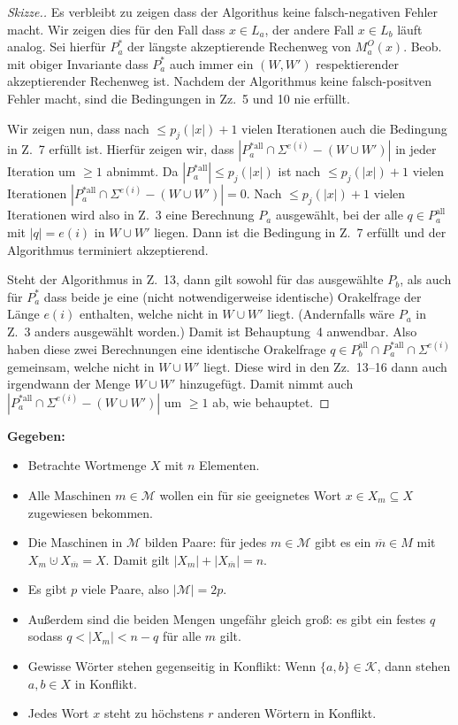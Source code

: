 \documentclass[nofonts]{uebung}
\begin{document}
\begin{proof}[Skizze.]
Es verbleibt zu zeigen dass der Algorithus keine falsch-negativen Fehler macht.
Wir zeigen dies für den Fall dass $x\in L_a$, der andere Fall $x\in L_b$ läuft analog.
Sei hierfür $P_a^*$ der längste akzeptierende Rechenweg von $M_a^O(x)$.
Beob. mit obiger Invariante dass $P_a^*$ auch immer ein $(W,W')$ respektierender akzeptierender Rechenweg ist.
Nachdem der Algorithmus keine falsch-positven Fehler macht, sind die Bedingungen in Zz.~5 und 10 nie erfüllt.

Wir zeigen nun, dass nach $\leq p_j(|x|)+1$ vielen Iterationen auch die Bedingung in Z.~7 erfüllt ist.
Hierfür zeigen wir, dass $|P_a^{*\mathrm{all}}\cap \Sigma^{e(i)}-(W\cup W')|$ in jeder Iteration um $\geq 1$ abnimmt. Da $|P_a^{*\mathrm{all}}|\leq p_j(|x|)$ ist nach $\leq p_j(|x|)+1$ vielen Iterationen $|P_a^{*\mathrm{all}}\cap \Sigma^{e(i)}-(W\cup W')|=0$.
Nach $\leq p_j(|x|)+1$ vielen Iterationen wird also in Z.~3 eine Berechnung $P_a$ ausgewählt, bei der alle $q\in P_a^{\mathrm{all}}$ mit $|q|=e(i)$ in $W\cup W'$ liegen. Dann ist die Bedingung in Z.~7 erfüllt und der Algorithmus terminiert akzeptierend.

Steht der Algorithmus in Z.~13, dann gilt sowohl für das ausgewählte $P_b$, als auch für $P_a^*$ dass beide je eine (nicht notwendigerweise identische) Orakelfrage der Länge $e(i)$ enthalten, welche nicht in $W\cup W'$ liegt. (Andernfalls  wäre $P_a$ in Z.~3 anders ausgewählt worden.)
Damit ist Behauptung~4 anwendbar. Also haben diese zwei Berechnungen eine identische Orakelfrage $q\in P_b^\mathrm{all}\cap P_a^{*\mathrm{all}}\cap \Sigma^{e(i)}$ gemeinsam, welche nicht in $W\cup W'$ liegt.
Diese wird in den Zz.~13--16 dann auch irgendwann der Menge $W\cup W'$ hinzugefügt.
Damit nimmt auch $|P_a^{*\mathrm{all}}\cap \Sigma^{e(i)}-(W\cup W')|$ um $\geq 1$ ab, wie behauptet.
\end{proof}

\clearpage

\noindent
\textbf{Gegeben:}
\begin{itemize}
    \item Betrachte Wortmenge $X$ mit $n$ Elementen.
    \item Alle Maschinen $m\in \mathcal M$ wollen ein für sie geeignetes Wort $x\in X_m\subseteq X$ zugewiesen bekommen.
    \item Die Maschinen in $\mathcal M$ bilden Paare: für jedes $m\in\mathcal M$ gibt es ein $\overline{m}\in M$ mit $X_m\cupdot X_{\overline{m}} = X$. Damit gilt $|X_m|+|X_{\overline{m}}|=n$.
    \item Es gibt $p$ viele Paare, also $|\mathcal M|=2p$.
    \item Außerdem sind die beiden Mengen ungefähr gleich groß: es gibt ein festes $q$ sodass $q< |X_m|< n-q$ für alle $m$ gilt.
    \item Gewisse Wörter stehen gegenseitig in Konflikt: Wenn $\{a,b\}\in \mathcal K$, dann stehen $a,b\in X$ in Konflikt.
    \item Jedes Wort $x$ steht zu höchstens $r$ anderen Wörtern in Konflikt.
\end{itemize}
\end{document}
